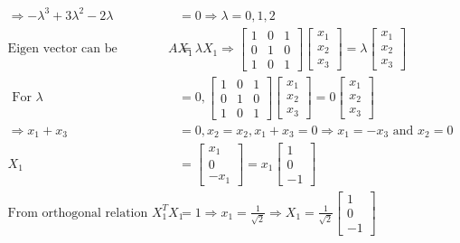 \begin{enumerate}
\begin{answer}
\begin{align*}
		\Rightarrow-\lambda^{3}+3 \lambda^{2}-2 \lambda&=0 \Rightarrow \lambda=0,1,2\\
		\text{Eigen vector can be determine by }A X_{1}&=\lambda X_{1} \Rightarrow\left[\begin{array}{lll}1 & 0 & 1 \\ 0 & 1 & 0 \\ 1 & 0 & 1\end{array}\right]\left[\begin{array}{l}x_{1} \\ x_{2} \\ x_{3}\end{array}\right]=\lambda\left[\begin{array}{l}x_{1} \\ x_{2} \\ x_{3}\end{array}\right]\\
	\text{	For }\lambda&=0,
		\left[\begin{array}{lll}
		1 & 0 & 1 \\
		0 & 1 & 0 \\
		1 & 0 & 1
		\end{array}\right]\left[\begin{array}{l}
		x_{1} \\
		x_{2} \\
		x_{3}
		\end{array}\right]=0\left[\begin{array}{l}
		x_{1} \\
		x_{2} \\
		x_{3}
		\end{array}\right]\\ \Rightarrow x_{1}+x_{3}&=0, x_{2}=x_{2}, x_{1}+x_{3}=0 \Rightarrow x_{1}=-x_{3} \text { and } x_{2}=0\\
		X_{1}&=\left[\begin{array}{c}
		x_{1} \\
		0 \\
		-x_{1}
		\end{array}\right]=x_{1}\left[\begin{array}{c}
		1 \\
		0 \\
		-1
		\end{array}\right]\\
		\text{From orthogonal relation }X_{1}^{T} X_{1}&=1 \Rightarrow x_{1}=\frac{1}{\sqrt{2}} \Rightarrow X_{1}=\frac{1}{\sqrt{2}}\left[\begin{array}{c}1 \\ 0 \\ -1\end{array}\right]

\end{align*}
\end{answer}
\end{enumerate}
